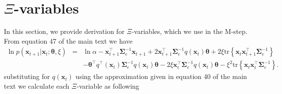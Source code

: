 \documentclass[]{article}
\begin{document}
\section*{$\Xi$-variables}\label{sec:Xivariables} 
In this section, we provide derivation for $\Xi$-variables, which we use in the M-step. From equation 47 of the main text we have
\begin{eqnarray}\label{eq:Qfunction}
  \ln p(\mathbf x_{t+1} | \mathbf x_t;\boldsymbol\theta,\xi)&=&\ln \alpha-\mathbf x_{t+1}^\top\boldsymbol\Sigma_e^{-1}\mathbf x_{t+1}+2\mathbf x_{t+1}^\top\boldsymbol\Sigma_e^{-1}q( \mathbf x_t)\boldsymbol\theta+2\xi \mathrm{tr} \left\lbrace \mathbf x_t\mathbf x_{t+1}^\top\boldsymbol\Sigma_e^{-1}\right\rbrace \nonumber \\
&&-\boldsymbol\theta^\top q^\top(\mathbf x_t)\boldsymbol\Sigma_e^{-1}q(\mathbf x_t)\boldsymbol\theta-2\xi \mathbf x_t^\top\boldsymbol\Sigma_e^{-1}q(\mathbf x_t)\boldsymbol\theta-\xi^2\mathrm{tr}\left\lbrace \mathbf x_t \mathbf x_t^\top\boldsymbol\Sigma_e^{-1}\right\rbrace. 
\end{eqnarray}
substituting for $q(\mathbf x_t)$ using the approximation given in equation 40 of the main text we calculate each $\Xi$-variable as following
\end{document}
